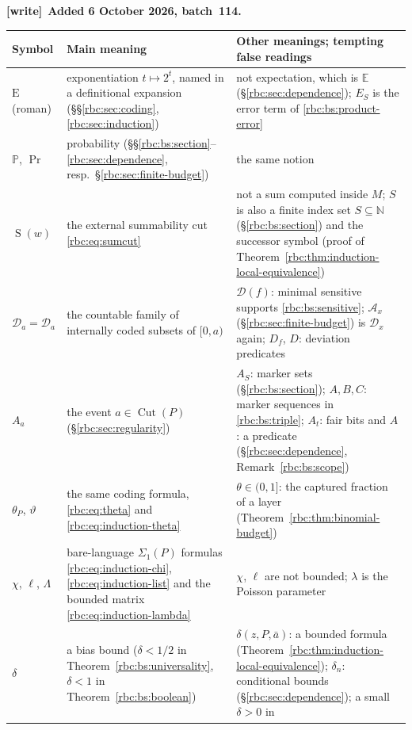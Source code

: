\documentclass[11pt]{article}
\numberwithin{equation}{section}
\theoremstyle{definition}
\theoremstyle{remark}
\newcommand{\N}{\mathbb N}
\newcommand{\E}{\mathrm E}
\newcommand{\Cut}{\operatorname{Cut}}
\newcommand{\SumCut}{\operatorname{S}}
\newcommand{\Prob}{\mathbb P}
\newcommand{\coded}{\mathcal D}
\newenvironment{writenote}[1][]{\par\smallskip\begingroup\small
 \noindent\textbf{[write]}\if\relax\detokenize{#1}\relax\else~\textbf{#1.}\fi\ }%
 {\par\endgroup\smallskip}
\begin{document}
\begin{writenote}[Added 6 October 2026, batch~114]
\begingroup\small\renewcommand{\arraystretch}{1.1}
\begin{center}
\begin{tabular}{>{\raggedright}p{}>{\raggedright}p{}>{\raggedright\arraybackslash}p{}}
\toprule
Symbol & Main meaning & Other meanings; tempting false readings\\
\midrule
$\E$ (roman) & exponentiation $t\mapsto2^t$, named in a definitional
 expansion (\S\S\ref{rbc:sec:coding}, \ref{rbc:sec:induction}) &
 not expectation, which is $\mathbb E$ (\S\ref{rbc:sec:dependence}); $E_S$ is
 the error term of \eqref{rbc:bs:product-error}\\
$\Prob$, $\Pr$ & probability (\S\S\ref{rbc:bs:section}--\ref{rbc:sec:dependence},
 resp.\ \S\ref{rbc:sec:finite-budget}) & the same notion\\
$\SumCut(w)$ & the external summability cut \eqref{rbc:eq:sumcut} & not a
 sum computed inside $M$; $S$ is also a finite index set $S\subseteq\N$
 (\S\ref{rbc:bs:section}) and the successor symbol (proof of
 Theorem~\ref{rbc:thm:induction-local-equivalence})\\
$\coded_a=\mathcal D_a$ & the countable family of internally coded subsets
 of $[0,a)$ & $\mathcal D(f)$: minimal sensitive supports
 \eqref{rbc:bs:sensitive}; $\mathcal A_x$ (\S\ref{rbc:sec:finite-budget}) is
 $\mathcal D_x$ again; $D_f$, $D$: deviation predicates\\
$A_a$ & the event $a\in\Cut(P)$ (\S\ref{rbc:sec:regularity}) & $A_S$:
 marker sets (\S\ref{rbc:bs:section}); $A,B,C$: marker sequences
 in \eqref{rbc:bs:triple}; $A_t$: fair bits and $A$: a predicate
 (\S\ref{rbc:sec:dependence}, Remark~\ref{rbc:bs:scope})\\
$\theta_P$, $\vartheta$ & the same coding formula,
 \eqref{rbc:eq:theta} and \eqref{rbc:eq:induction-theta} & $\theta\in(0,1]$:
 the captured fraction of a layer (Theorem~\ref{rbc:thm:binomial-budget})\\
$\chi$, $\ell$, $\Lambda$ & bare-language $\Sigma_1(P)$ formulas
 \eqref{rbc:eq:induction-chi}, \eqref{rbc:eq:induction-list} and the
 bounded matrix \eqref{rbc:eq:induction-lambda} & $\chi$, $\ell$ are not
 bounded; $\lambda$ is the Poisson parameter\\
$\delta$ & a bias bound ($\delta<1/2$ in Theorem~\ref{rbc:bs:universality},
 $\delta<1$ in Theorem~\ref{rbc:bs:boolean}) & $\delta(z,P,\bar a)$: a bounded
 formula (Theorem~\ref{rbc:thm:induction-local-equivalence}); $\delta_n$:
 conditional bounds (\S\ref{rbc:sec:dependence}); a small $\delta>0$ in

\end{tabular}
\end{center}
\end{writenote}
\end{document}
